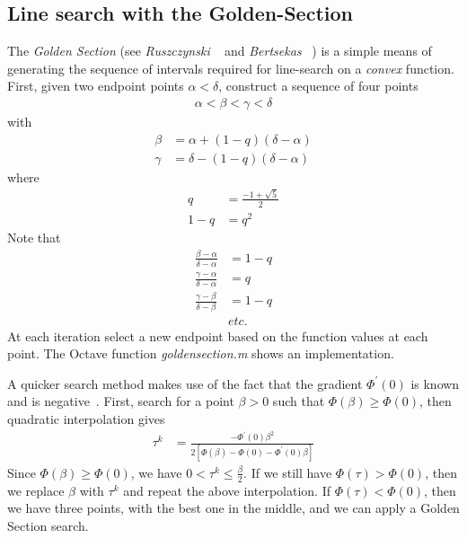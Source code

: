 \documentclass[a4paper,twoside,10pt,english]{report}
\begin{document}
\subsection{Line search with the Golden-Section}
The \emph{Golden Section} (see \emph{Ruszczynski} 
~\cite[p.213]{Ruszczynski_NonlinearOptimization}
and \emph{Bertsekas} 
~\cite[Appendix C.3]{Bertsekas_NonlinearProgramming}) is a simple
means of generating the sequence of intervals required for line-search
on a \emph{convex }function. First, given two endpoint points $\alpha<\delta$,
construct a sequence of four points 
\begin{align*}
\alpha<\beta<\gamma<\delta
\end{align*}
with
\begin{align*}
\beta &= \alpha+\left(1-q\right)\left(\delta-\alpha\right)\\
\gamma &= \delta-\left(1-q\right)\left(\delta-\alpha\right)
\end{align*}
where 
\begin{align*}
q &= \frac{-1+\sqrt{5}}{2}\\
1-q &= q^{2}
\end{align*}
Note that 
\begin{align*}
\frac{\beta-\alpha}{\delta-\alpha} &= 1-q\\
\frac{\gamma-\alpha}{\delta-\alpha} &= q\\
\frac{\gamma-\beta}{\delta-\beta} &= 1-q\\
 & etc.
\end{align*}
At each iteration select a new endpoint based on the function values
at each point. The Octave function \emph{goldensection.m} shows an 
implementation.

A quicker search method makes use of the fact that the gradient 
$\Phi^{\prime}\left(0\right)$ is known and is 
negative~\cite[p.215]{Ruszczynski_NonlinearOptimization}.
First, search for a point $\beta>0$ such that 
$\Phi\left(\beta\right)\ge\Phi\left(0\right)$, then quadratic interpolation gives
\begin{align*}
\tau^{k} &= \frac{-\Phi^{\prime}\left(0\right)\beta^{2}}
{2\left[\Phi\left(\beta\right)-\Phi\left(0\right)-
\Phi^{\prime}\left(0\right)\beta\right]}
\end{align*}
Since $\Phi\left(\beta\right)\ge\Phi\left(0\right)$, we have 
$0<\tau^{k}\le\frac{\beta}{2}$.
If we still have $\Phi\left(\tau\right)>\Phi\left(0\right)$, then
we replace $\beta$ with $\tau^{k}$ and repeat the above interpolation.
If $\Phi\left(\tau\right)<\Phi\left(0\right)$, then we have three
points, with the best one in the middle, and we can apply a Golden
Section search.
\end{document}
